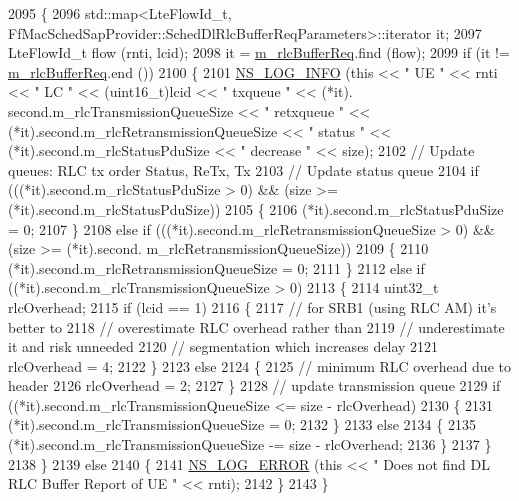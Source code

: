 \begin{DoxyCode}
2095 \{
2096   std::map<LteFlowId\_t, FfMacSchedSapProvider::SchedDlRlcBufferReqParameters>::iterator it;
2097   LteFlowId\_t flow (rnti, lcid);
2098   it = \hyperlink{classns3_1_1FdBetFfMacScheduler_a77bc6d5b9a64164f6974cc8d8b0318c0}{m\_rlcBufferReq}.find (flow);
2099   \textcolor{keywordflow}{if} (it != \hyperlink{classns3_1_1FdBetFfMacScheduler_a77bc6d5b9a64164f6974cc8d8b0318c0}{m\_rlcBufferReq}.end ())
2100     \{
2101       \hyperlink{group__logging_gafbd73ee2cf9f26b319f49086d8e860fb}{NS\_LOG\_INFO} (\textcolor{keyword}{this} << \textcolor{stringliteral}{" UE "} << rnti << \textcolor{stringliteral}{" LC "} << (uint16\_t)lcid << \textcolor{stringliteral}{" txqueue "} << (*it).
      second.m\_rlcTransmissionQueueSize << \textcolor{stringliteral}{" retxqueue "} << (*it).second.m\_rlcRetransmissionQueueSize << \textcolor{stringliteral}{" status "} 
      << (*it).second.m\_rlcStatusPduSize << \textcolor{stringliteral}{" decrease "} << size);
2102       \textcolor{comment}{// Update queues: RLC tx order Status, ReTx, Tx}
2103       \textcolor{comment}{// Update status queue}
2104       \textcolor{keywordflow}{if} (((*it).second.m\_rlcStatusPduSize > 0) && (size >= (*it).second.m\_rlcStatusPduSize))
2105         \{
2106           (*it).second.m\_rlcStatusPduSize = 0;
2107         \}
2108       \textcolor{keywordflow}{else} \textcolor{keywordflow}{if} (((*it).second.m\_rlcRetransmissionQueueSize > 0) && (size >= (*it).second.
      m\_rlcRetransmissionQueueSize))
2109         \{
2110           (*it).second.m\_rlcRetransmissionQueueSize = 0;
2111         \}
2112       \textcolor{keywordflow}{else} \textcolor{keywordflow}{if} ((*it).second.m\_rlcTransmissionQueueSize > 0)
2113         \{
2114           uint32\_t rlcOverhead;
2115           \textcolor{keywordflow}{if} (lcid == 1)
2116             \{
2117               \textcolor{comment}{// for SRB1 (using RLC AM) it's better to}
2118               \textcolor{comment}{// overestimate RLC overhead rather than}
2119               \textcolor{comment}{// underestimate it and risk unneeded}
2120               \textcolor{comment}{// segmentation which increases delay }
2121               rlcOverhead = 4;
2122             \}
2123           \textcolor{keywordflow}{else}
2124             \{
2125               \textcolor{comment}{// minimum RLC overhead due to header}
2126               rlcOverhead = 2;
2127             \}
2128           \textcolor{comment}{// update transmission queue}
2129           \textcolor{keywordflow}{if} ((*it).second.m\_rlcTransmissionQueueSize <= size - rlcOverhead)
2130             \{
2131               (*it).second.m\_rlcTransmissionQueueSize = 0;
2132             \}
2133           \textcolor{keywordflow}{else}
2134             \{
2135               (*it).second.m\_rlcTransmissionQueueSize -= size - rlcOverhead;
2136             \}
2137         \}
2138     \}
2139   \textcolor{keywordflow}{else}
2140     \{
2141       \hyperlink{group__logging_ga0261a8db1d4ac5f79417d117634fd455}{NS\_LOG\_ERROR} (\textcolor{keyword}{this} << \textcolor{stringliteral}{" Does not find DL RLC Buffer Report of UE "} << rnti);
2142     \}
2143 \}
\end{DoxyCode}



